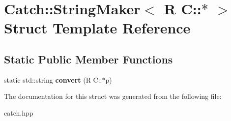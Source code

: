 \hypertarget{structCatch_1_1StringMaker_3_01R_01C_1_1_5_01_4}{}\section{Catch\+:\+:String\+Maker$<$ R C\+:\+:$\ast$ $>$ Struct Template Reference}
\label{structCatch_1_1StringMaker_3_01R_01C_1_1_5_01_4}
\subsection*{Static Public Member Functions}
\begin{DoxyCompactItemize}
\item 
\mbox{\label{structCatch_1_1StringMaker_3_01R_01C_1_1_5_01_4_af69c15e0b406e945777137fe4a333731}} 
static std\+::string {\bfseries convert} (R C\+::$\ast$p)
\end{DoxyCompactItemize}


The documentation for this struct was generated from the following file\+:\begin{DoxyCompactItemize}
\item 
catch.\+hpp\end{DoxyCompactItemize}
